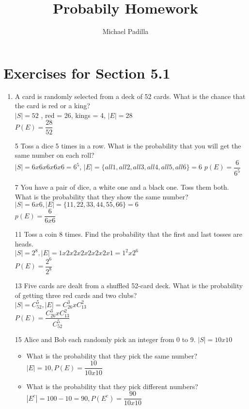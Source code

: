 \documentclass[12pt]{article}
\title{Probabily Homework}
\author{Michael Padilla}
\begin{document}
 
\maketitle
\section*{Exercises for Section 5.1}
\begin{enumerate}
    \item A card is randomly selected from a deck of 52 cards. What is the chance that the card is red or a king?\\
	$|S| = 52$ , red = 26, kings = 4, $|E| = 28$\\
	$P(E) = \dfrac{28}{52}$
    \item[5] Toss a dice 5 times in a row. What is the probability that you will get the same number on each roll?\\
	$|S| = 6x6x6x6x6 = 6^5$, $|E| = \{all1, all2, all3, all4, all5, all6\} = 6$
	$p(E) = \dfrac{6}{6^5}$
    \item[7] You have a pair of dice, a white one and a black one. Toss them both. What is the probability that they show the same number?\\
	$|S| = 6x6, |E| = \{11,22,33,44,55,66\} = 6$\\
	$p(E) = \dfrac{6}{6x6}$
    \item[11] Toss a coin 8 times. Find the probability that the first and last tosses are heads.\\
	$|S| = 2^8, |E| = 1x2x2x2x2x2x2x1 = 1^2x2^6$\\
	$P(E) = \dfrac{2^6}{2^8}$
    \item[13] Five cards are dealt from a shuffled 52-card deck. What is the probability of getting three red cards and two clubs?\\
	$|S| = C_{52}^5, |E| = C_{26}^3 x C_{13}^2$\\
	$P(E) = \dfrac{C_{26}^3 x C_{13}^2}{C_{52}^5}$
    \item[15] Alice and Bob each randomly pick an integer from 0 to 9.
	$|S| = 10x10$
	\begin{itemize}
	    \item What is the probability that they pick the same number?\\
		$|E| = 10, P(E) = \dfrac{10}{10x10}$
	    \item What is the probability that they pick different numbers?\\
		$|E^c| = 100-10=90, P(E^c) = \dfrac{90}{10x10}$
	\end{itemize}
\end{enumerate}
\end{document}
